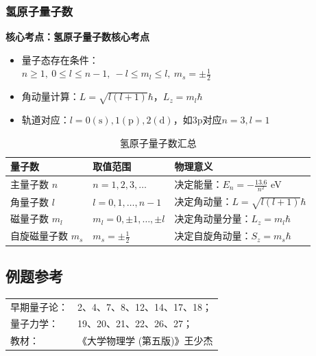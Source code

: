 \documentclass[12pt,a4paper,oneside]{article}
\numberwithin{equation}{section}
\newcommand{\corepoint}[1]{%
    \begin{tcolorbox}[
        colback=white,colframe=mainblue,boxrule=0.5pt,arc=2pt,
        left=6pt,right=6pt,top=2pt,bottom=2pt,center upper,
        boxsep=0pt
    ]
    \textbf{\color{mainblue}核心考点：#1}
    \end{tcolorbox}%
    \vspace{0.2em}
}
\begin{document}
\subsubsection{氢原子量子数}
\corepoint{氢原子量子数核心考点}
\begin{itemize}
    \item 量子态存在条件：\\
      $n\ge1,\ 0\le l \le n-1,\ -l\le m_l\le l,\ m_s=\pm\frac{1}{2}$
    \item 角动量计算：$L=\sqrt{l(l+1)}\hbar$，$L_z=m_l\hbar$
    \item 轨道对应：$l=0(\text{s}),1(\text{p}),2(\text{d})$，如$3\text{p}$对应$n=3,l=1$
\end{itemize}

\begin{table}[htbp]
    \centering
    \scriptsize
    \begin{tabular}{@{}p{2.2cm}|p{3.2cm}|p{5.6cm}@{}}
        \toprule
        \rowcolor{tablehead} 量子数 & 取值范围 & 物理意义 \\
        \midrule
        主量子数 $n$ & $n=1,2,3,\dots$ & 决定能量：$E_n = -\frac{13.6}{n^2}$ eV \\
        \midrule
        角量子数 $l$ & $l=0,1,\dots,n-1$ & 决定角动量：$L=\sqrt{l(l+1)}\hbar$ \\
        \midrule
        磁量子数 $m_l$ & $m_l=0,\pm1,\dots,\pm l$ & 决定角动量分量：$L_z=m_l\hbar$ \\
        \midrule
        自旋磁量子数 $m_s$ & $m_s=\pm\frac{1}{2}$ & 决定自旋角动量：$S_z=m_s\hbar$ \\
        \bottomrule
    \end{tabular}
    \caption{氢原子量子数汇总}
    \label{tab:quantum_number}
    \vspace{-0.5em}
\end{table}

\subsection{例题参考}
\textcolor{mainblue}{%
\begin{tabular}{@{}ll@{}}
早期量子论： & 2、4、7、8、12、14、17、18； \\
量子力学： & 19、20、21、22、26、27； \\
教材： & 《大学物理学 (第五版)》王少杰 \\
\end{tabular}
}
\end{document}
